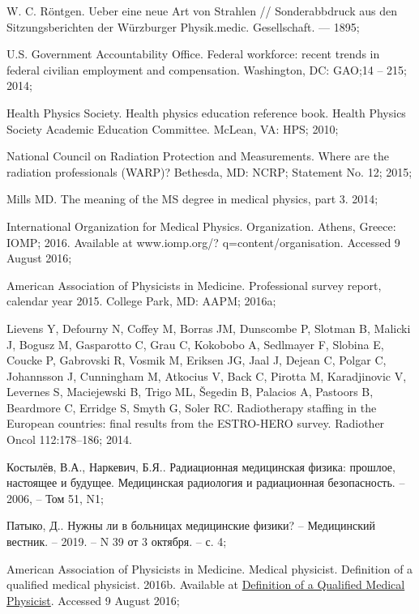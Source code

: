 \documentclass[a4paper,10pt]{extarticle}
\begin{document}
\begin{thebibliography}{99} %

W. C. Röntgen. Ueber eine neue Art von Strahlen // Sonderabbdruck aus den Sitzungsberichten der Würzburger Physik.medic. Gesellschaft. — 1895;

U.S. Government Accountability Office. Federal workforce: recent trends in federal civilian employment and compensation. Washington, DC: GAO;14 -- 215; 2014;

Health Physics Society. Health physics education reference book. Health Physics Society Academic Education Committee. McLean, VA: HPS; 2010;

National Council on Radiation Protection and Measurements. Where are the radiation professionals (WARP)? Bethesda, MD: NCRP; Statement No. 12; 2015;

Mills MD. The meaning of the MS degree in medical physics, part 3. 2014;

International Organization for Medical Physics. Organization. Athens, Greece: IOMP; 2016. Available at www.iomp.org/? q=content/organisation. Accessed 9 August 2016;

American Association of Physicists in Medicine. Professional survey report, calendar year 2015. College Park, MD: AAPM; 2016a;

Lievens Y, Defourny N, Coffey M, Borras JM, Dunscombe P, Slotman B, Malicki J, Bogusz M, Gasparotto C, Grau C, Kokobobo A, Sedlmayer F, Slobina E, Coucke P, Gabrovski R, Vosmik M, Eriksen JG, Jaal J, Dejean C, Polgar C, Johannsson J, Cunningham M, Atkocius V, Back C, Pirotta M, Karadjinovic V, Levernes S, Maciejewski B, Trigo ML, Šegedin B, Palacios A, Pastoors B, Beardmore C, Erridge S, Smyth G, Soler RC. Radiotherapy staffing in the European countries: final results from the ESTRO-HERO survey. Radiother Oncol 112:178–186; 2014.


Костылёв, В.А., Наркевич, Б.Я.. Радиационная медицинская физика: прошлое, настоящее и будущее. Медицинская радиология и радиационная безопасность. -- 2006, --  Том 51, N1;

Патыко, Д.. Нужны ли в больницах медицинские физики? -- Медицинский вестник. -- 2019. -- N 39 от 3 октября. -- с. 4;

American Association of Physicists in Medicine. Medical physicist. Definition of a qualified medical physicist. 2016b. Available at \href{https://w3.aapm.org/medical_physicist/fields.php}{Definition of a Qualified Medical Physicist}. Accessed 9 August 2016;



\end{thebibliography}
\end{document}

